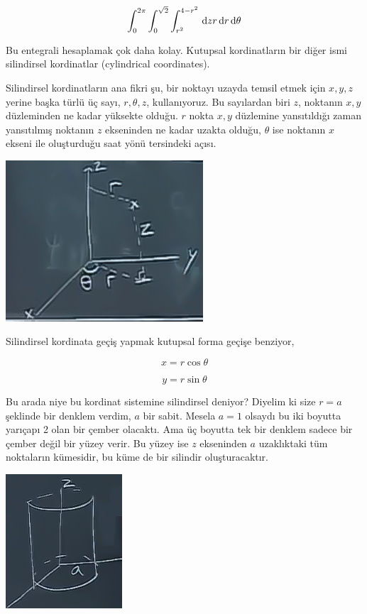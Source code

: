 \documentclass[12pt,fleqn]{article}\usepackage{../../common}
\begin{document}
$$ 
\int _{0}^{2\pi} \int _{0}^{\sqrt{2}} \int_{r^2}^{4-r^2} 
\,\mathrm{d} z r \,\mathrm{d} r \,\mathrm{d}\theta
$$

Bu entegrali hesaplamak çok daha kolay. Kutupsal kordinatların bir diğer
ismi silindirsel kordinatlar (cylindrical coordinates). 

Silindirsel kordinatların ana fikri şu, bir noktayı uzayda temsil etmek
için $x,y,z$ yerine başka türlü üç sayı, $r,\theta,z$, kullanıyoruz. Bu
sayılardan biri $z$, noktanın $x,y$ düzleminden ne kadar yüksekte
olduğu. $r$ nokta $x,y$ düzlemine yansıtıldığı zaman yansıtılmış noktanın
$z$ ekseninden ne kadar uzakta olduğu, $\theta$ ise noktanın $x$ ekseni ile
oluşturduğu saat yönü tersindeki açısı. 

\includegraphics[height=6cm]{25_8.png}

Silindirsel kordinata geçiş yapmak kutupsal forma geçişe benziyor, 

$$ x = r\cos\theta $$

$$ y = r\sin\theta $$

Bu arada niye bu kordinat sistemine silindirsel deniyor? Diyelim ki size
$r = a$ şeklinde bir denklem verdim, $a$ bir sabit. Mesela $a=1$ olsaydı bu
iki boyutta yarıçapı 2 olan bir çember olacaktı. Ama üç boyutta tek bir
denklem sadece bir çember değil bir yüzey verir. Bu yüzey ise $z$
ekseninden $a$ uzaklıktaki tüm noktaların kümesidir, bu küme de bir
silindir oluşturacaktır.

\includegraphics[height=5cm]{25_9.png}
\end{document}
